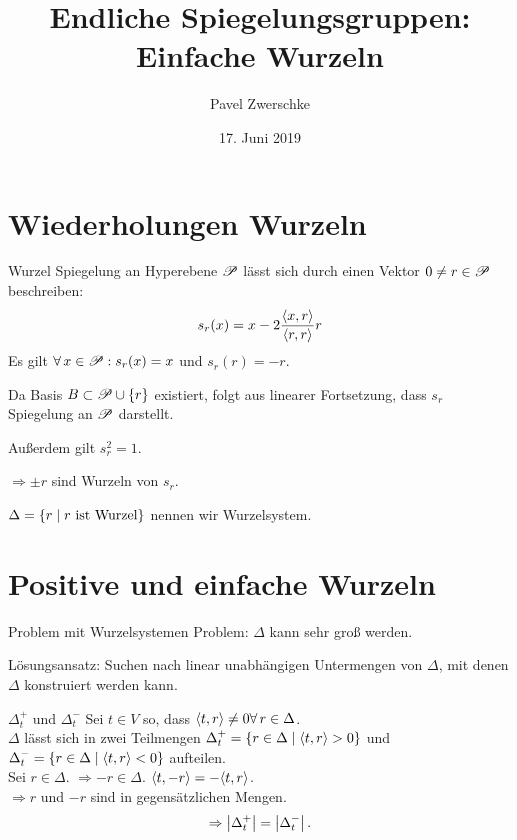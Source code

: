 \documentclass[18pt,draft]{beamer}
\title[Einfache Wurzeln]{Endliche Spiegelungsgruppen:\\
Einfache Wurzeln}
\author{Pavel Zwerschke}
\date{17. Juni 2019}
\begin{document}
\begin{frame}
    \maketitle
\end{frame}

\begin{frame}
    \tableofcontents
\end{frame}

\section{Wiederholungen Wurzeln}

\begin{frame}{Wurzel}
    Spiegelung an Hyperebene \( \mathscr{P} \) 
    lässt sich durch einen Vektor
    \( 0 \neq r \in \mathscr{P} \)
    beschreiben:
    \[ s_r(x) = x 
    - 2\frac{\langle x, r \rangle}{\langle r, r \rangle} r \]
    Es gilt \( \forall x \in \scrP: s_r(x) = x \) 
    und \( s_r(r) = -r \).

    Da Basis \( B \subset \mathscr{P} \cup \{r\} \) 
    existiert, folgt aus linearer Fortsetzung, dass 
    \( s_r \) Spiegelung an \( \mathscr{P} \) darstellt.

    Außerdem gilt \( s_r^2 = 1 \).

    \( \Rightarrow \pm r \) sind Wurzeln von \( s_r \).

    \( \Delta = \{ r \;\vert\; r \text{ ist Wurzel} \} \) 
    nennen wir Wurzelsystem.
\end{frame}
\section{Positive und einfache Wurzeln}
\begin{frame}{Problem mit Wurzelsystemen}
    Problem: \( \Delta \) kann sehr groß werden.

    Lösungsansatz: Suchen nach linear unabhängigen 
    Untermengen von \( \Delta \), mit denen \( \Delta \)
    konstruiert werden kann.
\end{frame}

\begin{frame}{\( \Delta_t^+ \) und \( \Delta_t^- \)}
    Sei \( t \in V \) so, dass \( \scalarprod{t}{r} \neq 0 
    \forall r \in \Delta \).\\
    \( \Delta \) lässt sich in zwei Teilmengen 
    \( \Delta_t^+ = 
    \{r \in \Delta \;\vert \; \langle t, r \rangle > 0\} \) 
    und \( \Delta_t^- = 
    \{r \in \Delta \;\vert \; \langle t, r \rangle < 0\} \) 
    aufteilen.\\
    Sei \( r \in \Delta \). \( \Rightarrow -r \in \Delta \).
    \( \langle t, -r \rangle = -\langle t, r \rangle \).\\
    \( \Rightarrow r \) und \( -r \) sind in 
    gegensätzlichen Mengen.
    \[ \Rightarrow \left|\Delta_t^+\right| = \left|\Delta_t^-\right|. \]
\end{frame}
\end{document}
